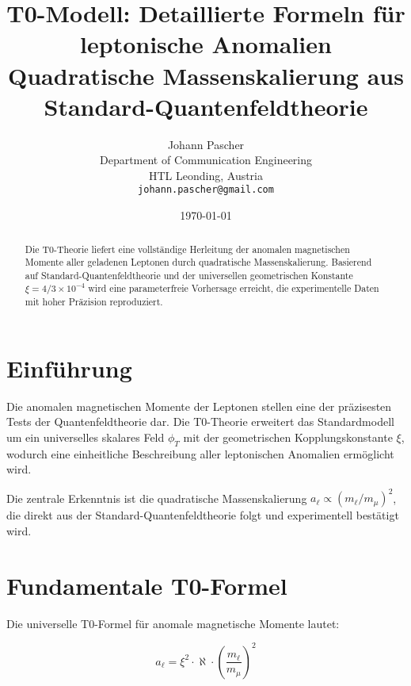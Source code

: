 \documentclass[12pt,a4paper]{article}
\begin{document}
	
	\title{T0-Modell: Detaillierte Formeln für leptonische Anomalien \\
		\large Quadratische Massenskalierung aus Standard-Quantenfeldtheorie}
	\author{Johann Pascher\\
		Department of Communication Engineering\\
		HTL Leonding, Austria\\
		\texttt{johann.pascher@gmail.com}}
	\date{\today}
	
	\maketitle
	
	\begin{abstract}
		Die T0-Theorie liefert eine vollständige Herleitung der anomalen magnetischen Momente aller geladenen Leptonen durch quadratische Massenskalierung. Basierend auf Standard-Quantenfeldtheorie und der universellen geometrischen Konstante $\xi = 4/3 \times 10^{-4}$ wird eine parameterfreie Vorhersage erreicht, die experimentelle Daten mit hoher Präzision reproduziert.
	\end{abstract}
	
	\tableofcontents
	\newpage
	
	\section{Einführung}
	
	Die anomalen magnetischen Momente der Leptonen stellen eine der präzisesten Tests der Quantenfeldtheorie dar. Die T0-Theorie erweitert das Standardmodell um ein universelles skalares Feld $\phi_T$ mit der geometrischen Kopplungskonstante $\xi$, wodurch eine einheitliche Beschreibung aller leptonischen Anomalien ermöglicht wird.
	
	Die zentrale Erkenntnis ist die quadratische Massenskalierung $a_\ell \propto (m_\ell/m_\mu)^2$, die direkt aus der Standard-Quantenfeldtheorie folgt und experimentell bestätigt wird.
	
	\section{Fundamentale T0-Formel}
	
	Die universelle T0-Formel für anomale magnetische Momente lautet:
	
	\begin{equation}
		\boxed{a_\ell = \xi^2 \cdot \aleph \cdot \left(\frac{m_\ell}{m_\mu}\right)^2}
	\end{equation}
	
\end{document}

